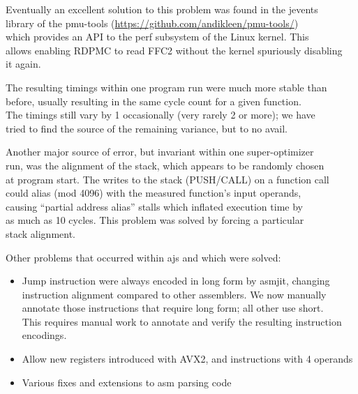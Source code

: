 Eventually an excellent solution to this problem was found in the
jevents\\
library of the pmu-tools
(\url{https://github.com/andikleen/pmu-tools/})\\
which provides an API to the perf subsystem of the Linux kernel. This\\
allows enabling RDPMC to read FFC2 without the kernel spuriously
disabling\\
it again.

The resulting timings within one program run were much more stable
than\\
before, usually resulting in the same cycle count for a given
function.\\
The timings still vary by 1 occasionally (very rarely 2 or more); we
have\\
tried to find the source of the remaining variance, but to no avail.

Another major source of error, but invariant within one
super-optimizer\\
run, was the alignment of the stack, which appears to be randomly
chosen\\
at program start. The writes to the stack (PUSH/CALL) on a function
call\\
could alias (mod 4096) with the measured function's input operands,\\
causing ``partial address alias'' stalls which inflated execution time
by\\
as much as 10 cycles. This problem was solved by forcing a particular\\
stack alignment.

Other problems that occurred within ajs and which were solved:

\begin{itemize}
\tightlist
\item
  Jump instruction were always encoded in long form by asmjit,
  changing\\
  instruction alignment compared to other assemblers. We now manually\\
  annotate those instructions that require long form; all other use
  short.\\
  This requires manual work to annotate and verify the resulting
  instruction\\
  encodings.
\item
  Allow new registers introduced with AVX2, and instructions with 4
  operands
\item
  Various fixes and extensions to asm parsing code
\end{itemize}

